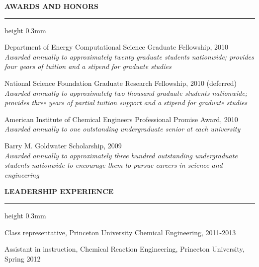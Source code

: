 \documentclass[letterpaper,10pt]{article}
\newenvironment{itemize*}
  {\begin{itemize}
    \setlength{\parskip}{-2pt}}
  {\end{itemize}}
\newcommand{\cvheading}[1]{
\vspace{0.15in}
\noindent
\MakeUppercase{\bf #1}
\vspace{0.08in}
{\hrule height 0.3mm}
\vspace{0.08in}}
\begin{document}
\cvheading{Awards and Honors}
\noindent
\begin{itemize*}
\item Department of Energy Computational Science Graduate Fellowship, 2010 \\
    {\em \small Awarded annually to approximately twenty graduate students nationwide; provides four years of tuition and a stipend for graduate studies}
\item National Science Foundation Graduate Research Fellowship, 2010 (deferred)\\
    {\em \small Awarded annually to approximately two thousand graduate students nationwide; provides three years of partial tuition support and a stipend for graduate studies}
\item American Institute of Chemical Engineers Professional Promise Award, 2010\\
    {\em \small Awarded annually to one outstanding undergraduate senior at each university}
\item Barry M. Goldwater Scholarship, 2009\\
    {\em \small Awarded annually to approximately three hundred outstanding undergraduate students nationwide to encourage them to pursue careers in science and engineering}
\end{itemize*}

\cvheading{Leadership Experience}
\begin{itemize*}
\item Class representative, Princeton University Chemical Engineering, 2011-2013
\item Assistant in instruction, Chemical Reaction Engineering, Princeton University, Spring 2012
\end{itemize*}
\end{document}
